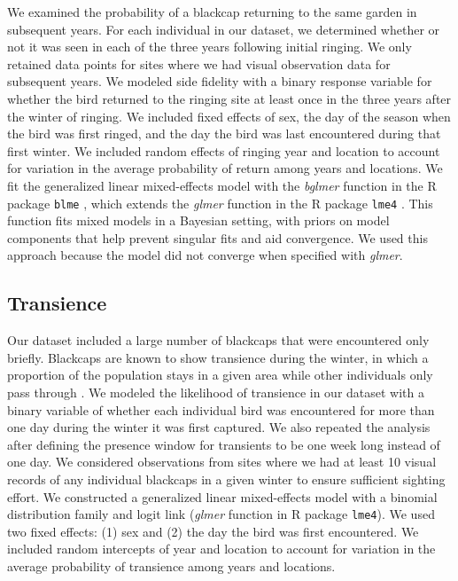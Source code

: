\documentclass[a4paper, nobind]{templates/ociamthesis}
\begin{document}
We examined the probability of a blackcap returning to the same garden in subsequent years. For each individual in our dataset, we determined whether or not it was seen in each of the three years following initial ringing. We only retained data points for sites where we had visual observation data for subsequent years. We modeled side fidelity with a binary response variable for whether the bird returned to the ringing site at least once in the three years after the winter of ringing. We included fixed effects of sex, the day of the season when the bird was first ringed, and the day the bird was last encountered during that first winter. We included random effects of ringing year and location to account for variation in the average probability of return among years and locations. We fit the generalized linear mixed-effects model with the \emph{bglmer} function in the R package \texttt{blme} \autocite{chungNondegeneratePenalizedLikelihood2013}, which extends the \emph{glmer} function in the R package \texttt{lme4} \autocite{batesFittingLinearMixedeffects2015}. This function fits mixed models in a Bayesian setting, with priors on model components that help prevent singular fits and aid convergence. We used this approach because the model did not converge when specified with \emph{glmer}.

\hypertarget{transience}{%
\subsection{Transience}\label{transience}}

Our dataset included a large number of blackcaps that were encountered only briefly. Blackcaps are known to show transience during the winter, in which a proportion of the population stays in a given area while other individuals only pass through \autocite{beldaResidentTransientDynamics2007,cuadradoYearYearRecurrence1992}. We modeled the likelihood of transience in our dataset with a binary variable of whether each individual bird was encountered for more than one day during the winter it was first captured. We also repeated the analysis after defining the presence window for transients to be one week long instead of one day. We considered observations from sites where we had at least 10 visual records of any individual blackcaps in a given winter to ensure sufficient sighting effort. We constructed a generalized linear mixed-effects model with a binomial distribution family and logit link (\emph{glmer} function in R package \texttt{lme4}). We used two fixed effects: (1) sex and (2) the day the bird was first encountered. We included random intercepts of year and location to account for variation in the average probability of transience among years and locations.
\end{document}
